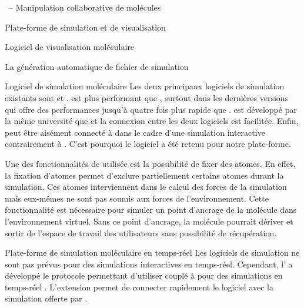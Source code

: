 \documentclass[myfrancais]{mythesis}
\begin{document}
\begin{mychapter}{\myShaddock\ -- Manipulation collaborative de molécules}
\begin{mysection}{Plate-forme de simulation et de visualisation}
\begin{mysubsection}{Logiciel de visualisation moléculaire}
\begin{mysubsubsection}{La génération automatique de fichier de simulation}
				\end{mysubsubsection}
			\end{mysubsection}
			\begin{mysubsection}{Logiciel de simulation moléculaire}
				Les deux principaux logiciels de simulation existants sont   et \myGromacs {}.
				\myGromacs est plus performant que , surtout dans les dernières versions  qui offre des performances jusqu'à quatre fois plus rapide que .
				 est développé par la même université que  et la connexion entre les deux logiciels est facilitée.
				Enfin,  peut être aisément connecté à  dans le cadre d'une simulation interactive contrairement à \myGromacs.
				C'est pourquoi le logiciel  a été retenu pour notre plate-forme.

				Une des fonctionnalités de  utilisée est la possibilité de \og fixer \fg des atomes.
				En effet, la fixation d'atomes permet d'exclure partiellement certains atomes durant la simulation.
				Ces atomes interviennent dans le calcul des forces de la simulation mais eux-mêmes ne sont pas soumis aux forces de l'environnement.
				Cette fonctionnalité est nécessaire pour simuler un point d'ancrage de la molécule dans l'environnement virtuel.
				Sans ce point d'ancrage, la molécule pourrait dériver et sortir de l'espace de travail des utilisateurs sans possibilité de récupération.
				\begin{mysubsubsection}{Plate-forme de simulation moléculaire en temps-réel}
					Les logiciels de simulation ne sont pas prévus pour des simulations interactives en temps-réel.
					Cependant, l' a développé le protocole  permettant d'utiliser  couplé à  pour des simulations en temps-réel .
					L'extension  permet de connecter rapidement le logiciel  avec la simulation offerte par .


\end{mysubsubsection}
\end{mysubsection}
\end{mysection}
\end{mychapter}
\end{document}
